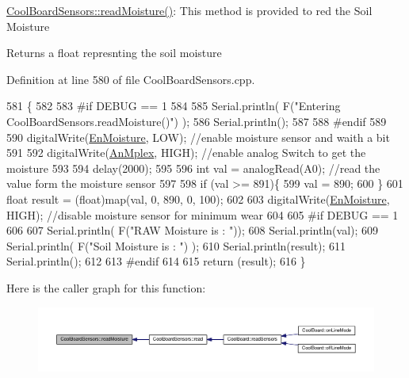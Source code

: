 \hyperlink{class_cool_board_sensors_a8761bff50373c485f4465c8db47d0633}{Cool\+Board\+Sensors\+::read\+Moisture()}\+: This method is provided to red the Soil Moisture

\begin{DoxyReturn}{Returns}
a float represnting the soil moisture 
\end{DoxyReturn}


Definition at line 580 of file Cool\+Board\+Sensors.\+cpp.


\begin{DoxyCode}
581 \{
582 
583 \textcolor{preprocessor}{#if DEBUG == 1}
584     
585     Serial.println( F(\textcolor{stringliteral}{"Entering CoolBoardSensors.readMoisture()"}) );
586     Serial.println();
587     
588 \textcolor{preprocessor}{#endif}
589 
590     digitalWrite(\hyperlink{class_cool_board_sensors_a6177d02e14a057a2f171a2e930b5038d}{EnMoisture}, LOW);                 \textcolor{comment}{//enable moisture sensor and waith a bit}
591 
592     digitalWrite(\hyperlink{class_cool_board_sensors_a12ef28b1046219e0aee10bf64e28c4a5}{AnMplex}, HIGH);         \textcolor{comment}{//enable analog Switch to get the moisture}
593 
594     delay(2000);
595 
596     \textcolor{keywordtype}{int} val = analogRead(A0);                       \textcolor{comment}{//read the value form the moisture sensor}
597 
598     \textcolor{keywordflow}{if} (val >= 891)\{
599         val = 890;
600     \}
601     \textcolor{keywordtype}{float} result = (float)map(val, 0, 890, 0, 100); 
602 
603     digitalWrite(\hyperlink{class_cool_board_sensors_a6177d02e14a057a2f171a2e930b5038d}{EnMoisture}, HIGH);                  \textcolor{comment}{//disable moisture sensor for minimum wear}
604     
605 \textcolor{preprocessor}{#if DEBUG == 1 }
606 
607     Serial.println( F(\textcolor{stringliteral}{"RAW Moisture  is : "}));
608     Serial.println(val);
609     Serial.println( F(\textcolor{stringliteral}{"Soil Moisture is : "}) );
610     Serial.println(result);
611     Serial.println();
612 
613 \textcolor{preprocessor}{#endif }
614 
615     \textcolor{keywordflow}{return} (result);
616 \}
\end{DoxyCode}
Here is the caller graph for this function\+:\nopagebreak
\begin{figure}[H]
\begin{center}
\leavevmode
\includegraphics[width=350pt]{de/d46/class_cool_board_sensors_a8761bff50373c485f4465c8db47d0633_icgraph}
\end{center}
\end{figure}
\mbox{\label{class_cool_board_sensors_a6944b6ea7bce8e2fce1b434acfd9d5f3}} 
